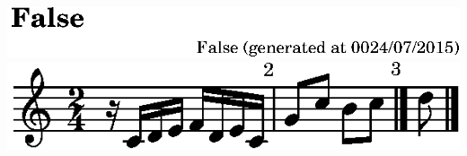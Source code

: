 \includegraphics{../examples/tinynotation/42/lily-08b23daa-1}%
\ifx\betweenLilyPondSystem \undefined
  \linebreak
\else
  \expandafter{}%
\fi
\includegraphics{../examples/tinynotation/42/lily-08b23daa-2}%
